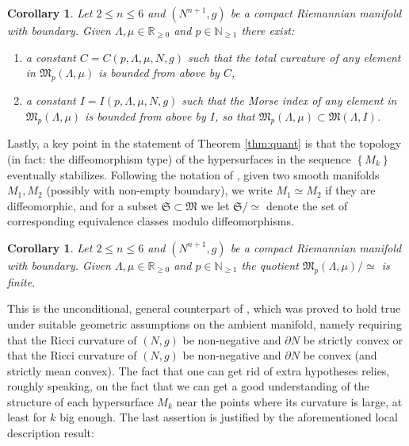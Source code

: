\documentclass[JEP,XML,SOM,Unicode]{cedram}
\newtheorem{cor}[thm]{Corollary}
\theoremstyle{definition}
\newcommand{\R}{\mathbb{R}}
\newcommand{\N}{\mathbb{N}}
\begin{document}
\begin{cor}\label{cor:totcurvbound}
Let $2\leq n\leq 6$ and $(N^{n+1},g)$ be a compact Riemannian manifold with boundary. Given $\Lambda, \mu\in \R_{\geq 0}$ and $p\in\N_{\geq 1}$ there exist:
\begin{enumerate}
\item
a constant $C=C(p,\Lambda,\mu, N, g)$ such that the total curvature of any element in $\mathfrak{M}_p(\Lambda, \mu)$ is bounded from above by $C$,
\item
a constant $I=I(p,\Lambda,\mu, N, g)$ such that the Morse index of any element in $\mathfrak{M}_p(\Lambda, \mu)$ is bounded from above by $I$, so that $\mathfrak{M}_p(\Lambda,\mu)\subset\mathfrak{M}(\Lambda,I)$.
\end{enumerate}
\end{cor}

Lastly, a key point in the statement of Theorem \ref{thm:quant} is that the topology (in fact: the diffeomorphism type) of the hypersurfaces in the sequence $\left\{M_k\right\}$ eventually stabilizes. Following the notation of \cite{ACS17}, given two smooth manifolds $M_1, M_2$ (possibly with non-empty boundary), we write $M_1\simeq M_2$ if they are diffeomorphic, and for a subset $\mathfrak{S}\subset\mathfrak{M}$ we let $\mathfrak{S}/{\simeq}$ denote the set of corresponding equivalence classes modulo diffeomorphisms.

\begin{cor}\label{cor:finite}
Let $2\leq n\leq 6$ and $(N^{n+1},g)$ be a compact Riemannian manifold with boundary. Given $\Lambda, \mu\in \R_{\geq 0}$ and $p\in \N_{\geq 1}$ the quotient $\mathfrak{M}_p(\Lambda, \mu)/{\simeq}$ is finite.
\end{cor}

This is the unconditional, general counterpart of \cite[Cor.\,7]{ACS17}, which was proved to hold true under suitable geometric assumptions on the ambient manifold, namely requi\-ring that the Ricci curvature of $(N,g)$ be non-negative and $\partial N$ be strictly convex or that the Ricci curvature of $(N,g)$ be non-negative and $\partial N$ be convex (and strictly mean convex). The fact that one can get rid of extra hypotheses relies, roughly speaking, on the fact that we can get a good understanding of the structure of each hyper\-surface $M_k$ near the points where its curvature is large, at least for $k$ big enough.
The last assertion is justified by the aforementioned local description result:
\end{document}
